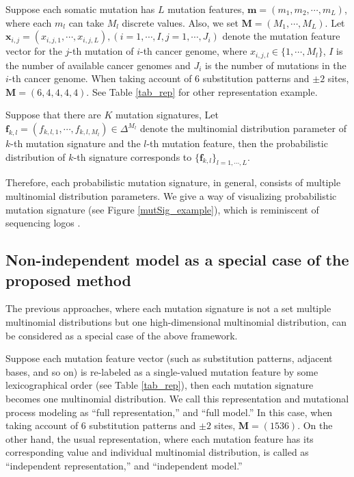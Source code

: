 Suppose each somatic mutation has $L$ mutation features, $\bm{m} = (m_1, m_2, \cdots, m_L)$, 
where each $m_l$ can take $M_l$ discrete values. Also, we set $\bm{M} = (M_1, \cdots, M_L)$.
Let $\bm{x}_{i, j} = (x_{i, j, 1}, \cdots, x_{i, j, L}), (i = 1, \cdots, I, j = 1, \cdots, J_i)$ denote the mutation feature vector for the $j$-th mutation of $i$-th cancer genome,
where $x_{i, j, l} \in \{1, \cdots, M_l \}$, $I$ is the number of available cancer genomes and $J_i$ is the number of mutations in the $i$-th cancer genome.
When taking account of 6 substitution patterns and $\pm 2$ sites,
$\bm{M} = (6, 4, 4, 4, 4)$.
See Table \ref{tab_rep} for other representation example.

Suppose that there are $K$ mutation signatures,
Let  $\bm{f}_{k, l} = (f_{k, l, 1}, \cdots, f_{k, l, M_l }) \in \Delta^{M_l}$ denote 
the multinomial distribution parameter of $k$-th mutation signature and the $l$-th mutation feature, 
then the probabilistic distribution of $k$-th signature corresponds to $\{ \bm{f}_{k, l} \}_{l=1, \cdots, L}$.
 
Therefore, each probabilistic mutation signature, in general, consists of multiple multinomial distribution parameters.
We give a way of visualizing probabilistic mutation signature (see Figure \ref{mutSig_example}), 
which is reminiscent of sequencing logos \cite{pmid2172928}. 



\subsection*{Non-independent model as a special case of the proposed method}


The previous approaches, 
where each mutation signature is not a set multiple multinomial distributions but one high-dimensional multinomial distribution,
can be considered as a special case of the above framework.

Suppose each mutation feature vector (such as substitution patterns, adjacent bases, and so on) 
is re-labeled as a single-valued mutation feature by some lexicographical order (see Table \ref{tab_rep}),
then each mutation signature becomes one multinomial distribution. 
We call this representation and mutational process modeling as ``full representation,'' and ``full model.''
In this case, when taking account of 6 substitution patterns and $\pm 2$ sites,
$\bm{M} = (1536)$.
On the other hand, the usual representation, where each mutation feature has its corresponding value and individual multinomial distribution,
is called as ``independent representation,'' and ``independent model.''

